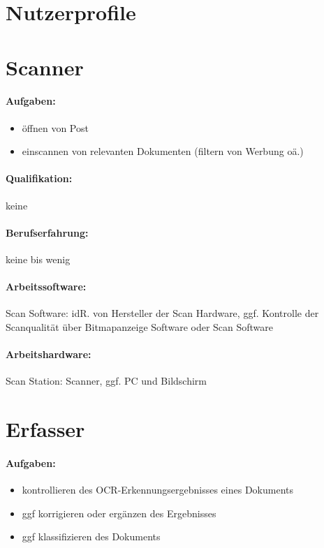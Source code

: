 \documentclass[11pt,oneside,a4paper,notitlepage]{article}
\begin{document}
%

\section{Nutzerprofile}


\section{Scanner}

\paragraph*{Aufgaben: }
\begin{itemize}
\item öffnen von Post
\item einscannen von relevanten Dokumenten (filtern von Werbung oä.)
\end{itemize}
%
%
\paragraph*{Qualifikation: } keine
%
\paragraph*{Berufserfahrung: } keine bis wenig
%
\paragraph*{Arbeitssoftware: } Scan Software: idR. von Hersteller der Scan Hardware, ggf. Kontrolle der Scanqualität über
Bitmapanzeige Software oder Scan Software
%
\paragraph*{Arbeitshardware: } Scan Station: Scanner, ggf. PC und Bildschirm

%
%
\section{Erfasser}
\paragraph*{Aufgaben: }
\begin{itemize}
\item kontrollieren des OCR-Erkennungsergebnisses eines Dokuments
\item ggf korrigieren oder ergänzen des Ergebnisses
\item ggf klassifizieren des Dokuments
\end{itemize}
%
%
\end{document}
